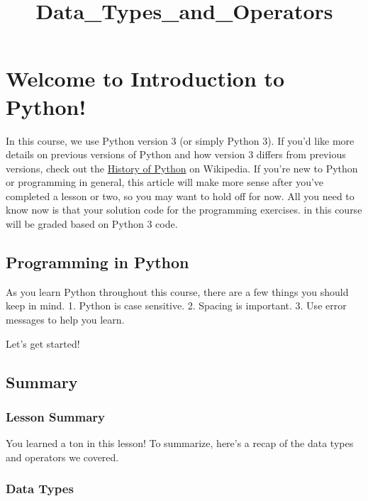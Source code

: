 \documentclass[11pt]{article}
\title{Data\_Types\_and\_Operators}
\begin{document}
    
    \maketitle
    
    

    
    \hypertarget{welcome-to-introduction-to-python}{%
\section{Welcome to Introduction to
Python!}\label{welcome-to-introduction-to-python}}

    In this course, we use Python version 3 (or simply Python 3). If you'd
like more details on previous versions of Python and how version 3
differs from previous versions, check out the
\href{https://en.wikipedia.org/wiki/History_of_Python}{History of
Python} on Wikipedia. If you're new to Python or programming in general,
this article will make more sense after you've completed a lesson or
two, so you may want to hold off for now. All you need to know now is
that your solution code for the programming exercises. in this course
will be graded based on Python 3 code.

    \hypertarget{programming-in-python}{%
\subsection{Programming in Python}\label{programming-in-python}}

As you learn Python throughout this course, there are a few things you
should keep in mind. 1. Python is case sensitive. 2. Spacing is
important. 3. Use error messages to help you learn.

Let's get started!

    \hypertarget{summary}{%
\subsection{Summary}\label{summary}}

    \hypertarget{lesson-summary}{%
\subsubsection{Lesson Summary}\label{lesson-summary}}

You learned a ton in this lesson! To summarize, here's a recap of the
data types and operators we covered.

\hypertarget{data-types}{%
\subsubsection{Data Types}\label{data-types}}
\end{document}
